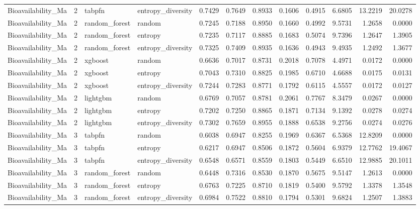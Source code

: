 \begin{tabular}{lrllrrrrrrrr}
Bioavailability_Ma & 2 & tabpfn & entropy_diversity & 0.7429 & 0.7649 & 0.8933 & 0.1606 & 0.4915 & 6.6805 & 13.2219 & 20.0278 \\
Bioavailability_Ma & 2 & random_forest & random & 0.7245 & 0.7188 & 0.8950 & 0.1660 & 0.4992 & 9.5731 & 1.2658 & 0.0000 \\
Bioavailability_Ma & 2 & random_forest & entropy & 0.7235 & 0.7117 & 0.8885 & 0.1683 & 0.5074 & 9.7396 & 1.2647 & 1.3905 \\
Bioavailability_Ma & 2 & random_forest & entropy_diversity & 0.7325 & 0.7409 & 0.8935 & 0.1636 & 0.4943 & 9.4935 & 1.2492 & 1.3677 \\
Bioavailability_Ma & 2 & xgboost & random & 0.6636 & 0.7017 & 0.8731 & 0.2018 & 0.7078 & 4.4971 & 0.0172 & 0.0000 \\
Bioavailability_Ma & 2 & xgboost & entropy & 0.7043 & 0.7310 & 0.8825 & 0.1985 & 0.6710 & 4.6688 & 0.0175 & 0.0131 \\
Bioavailability_Ma & 2 & xgboost & entropy_diversity & 0.7244 & 0.7283 & 0.8771 & 0.1792 & 0.6115 & 4.5557 & 0.0172 & 0.0127 \\
Bioavailability_Ma & 2 & lightgbm & random & 0.6769 & 0.7057 & 0.8781 & 0.2061 & 0.7767 & 8.3479 & 0.0267 & 0.0000 \\
Bioavailability_Ma & 2 & lightgbm & entropy & 0.7202 & 0.7250 & 0.8865 & 0.1871 & 0.7134 & 9.1392 & 0.0278 & 0.0274 \\
Bioavailability_Ma & 2 & lightgbm & entropy_diversity & 0.7302 & 0.7659 & 0.8955 & 0.1888 & 0.6538 & 9.2756 & 0.0274 & 0.0276 \\
Bioavailability_Ma & 3 & tabpfn & random & 0.6038 & 0.6947 & 0.8255 & 0.1969 & 0.6367 & 6.5368 & 12.8209 & 0.0000 \\
Bioavailability_Ma & 3 & tabpfn & entropy & 0.6217 & 0.6947 & 0.8506 & 0.1872 & 0.5604 & 6.9379 & 12.7762 & 19.4067 \\
Bioavailability_Ma & 3 & tabpfn & entropy_diversity & 0.6548 & 0.6571 & 0.8559 & 0.1803 & 0.5449 & 6.6510 & 12.9885 & 20.1011 \\
Bioavailability_Ma & 3 & random_forest & random & 0.6448 & 0.7316 & 0.8530 & 0.1870 & 0.5675 & 9.5147 & 1.2613 & 0.0000 \\
Bioavailability_Ma & 3 & random_forest & entropy & 0.6763 & 0.7225 & 0.8710 & 0.1819 & 0.5400 & 9.5792 & 1.3378 & 1.3548 \\
Bioavailability_Ma & 3 & random_forest & entropy_diversity & 0.6984 & 0.7522 & 0.8810 & 0.1794 & 0.5301 & 9.6824 & 1.2507 & 1.3883 \\

\end{tabular}
